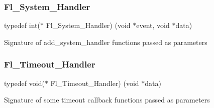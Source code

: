 \subsubsection{\texorpdfstring{Fl\+\_\+\+System\+\_\+\+Handler}{Fl\_System\_Handler}}
{\footnotesize\ttfamily typedef int($\ast$ Fl\+\_\+\+System\+\_\+\+Handler) (void $\ast$event, void $\ast$data)}

Signature of add\+\_\+system\+\_\+handler functions passed as parameters \mbox{\label{group__callback__functions_ga17b5c6570394124287997166a50ff07a}} 
\subsubsection{\texorpdfstring{Fl\+\_\+\+Timeout\+\_\+\+Handler}{Fl\_Timeout\_Handler}}
{\footnotesize\ttfamily typedef void($\ast$ Fl\+\_\+\+Timeout\+\_\+\+Handler) (void $\ast$data)}

Signature of some timeout callback functions passed as parameters 